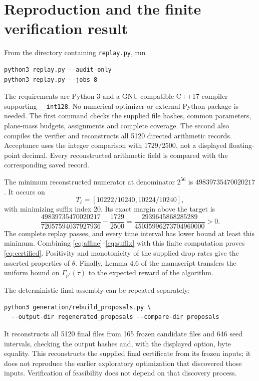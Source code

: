 \documentclass[11pt,a4paper]{article}
\begin{document}
\section{Reproduction and the finite verification result}\label{sec:reproduce}
From the directory containing \texttt{replay.py}, run
\begin{verbatim}
python3 replay.py --audit-only
python3 replay.py --jobs 8
\end{verbatim}
The requirements are Python 3 and a GNU-compatible C++17 compiler supporting
\texttt{\_\_int128}. No numerical optimizer or external Python package is
needed. The first command checks the supplied file hashes, common parameters,
plane-mass budgets, assignments and complete coverage. The second also
compiles the verifier and reconstructs all 5120 directed arithmetic records.
Acceptance uses the integer comparison with $1729/2500$, not a displayed
floating-point decimal. Every reconstructed arithmetic field is compared
with the corresponding saved record.

The minimum reconstructed numerator at denominator $2^{56}$ is
$49839735470020217$. It occurs on
\[
 T_\ell=[10222/10240,10224/10240],
\]
with minimizing suffix index 20. Its exact margin above the target is
\[
 \frac{49839735470020217}{72057594037927936}-\frac{1729}{2500}
 =\frac{2939645868285289}{45035996273704960000}>0.
\]
The complete replay passes, and every time interval has lower bound at
least this minimum. Combining \eqref{eq:affine}--\eqref{eq:suffix} with this
finite computation proves \eqref{eq:certified}. Positivity and monotonicity
of the supplied drop rates give the asserted properties of $\theta$.
Finally, Lemma 4.6 of the manuscript transfers the uniform bound on
$\Gamma_{p^*}(\tau)$ to the expected reward of the algorithm.

The deterministic final assembly can be repeated separately:
\begin{verbatim}
python3 generation/rebuild_proposals.py \
  --output-dir regenerated_proposals --compare-dir proposals
\end{verbatim}
It reconstructs all 5120 final files from 165 frozen candidate files and
646 seed intervals, checking the output hashes and, with the displayed
option, byte equality. This reconstructs the supplied final certificate
from its frozen inputs; it does not reproduce the earlier exploratory
optimization that discovered those inputs. Verification of feasibility
does not depend on that discovery process.
\end{document}
